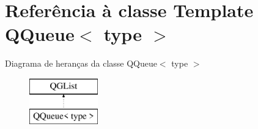 \hypertarget{class_q_queue}{\section{Referência à classe Template Q\-Queue$<$ type $>$}
\label{class_q_queue}
}
Diagrama de heranças da classe Q\-Queue$<$ type $>$\begin{figure}[H]
\begin{center}
\leavevmode
\includegraphics[height=2.000000cm]{class_q_queue}
\end{center}
\end{figure}
